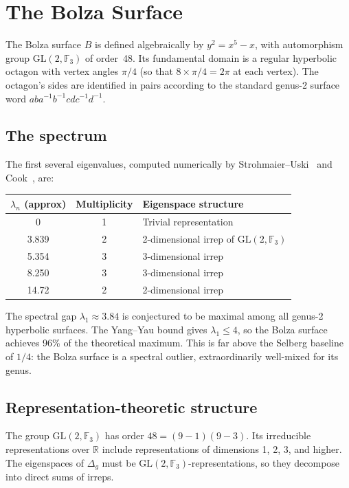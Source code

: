 \documentclass[11pt,a4paper]{article}
\begin{document}
\section{The Bolza Surface}

The Bolza surface $B$ is defined algebraically by $y^2 = x^5 - x$, with
automorphism group $\mathrm{GL}(2, \mathbb{F}_3)$ of order~48. Its fundamental
domain is a regular hyperbolic octagon with vertex angles $\pi/4$ (so that
$8 \times \pi/4 = 2\pi$ at each vertex). The octagon's sides are identified
in pairs according to the standard genus-2 surface word $aba^{-1}b^{-1}cdc^{-1}d^{-1}$.

\subsection{The spectrum}

The first several eigenvalues, computed numerically by
Strohmaier--Uski~\cite{strohmaier2013} and Cook~\cite{cook2018}, are:

\medskip
\begin{center}
\renewcommand{\arraystretch}{1.3}
\begin{tabular}{@{}ccl@{}}
\toprule
$\lambda_n$ (approx) & Multiplicity & Eigenspace structure \\
\midrule
0 & 1 & Trivial representation \\
3.839 & 2 & 2-dimensional irrep of $\mathrm{GL}(2, \mathbb{F}_3)$ \\
5.354 & 3 & 3-dimensional irrep \\
8.250 & 3 & 3-dimensional irrep \\
14.72 & 2 & 2-dimensional irrep \\
\bottomrule
\end{tabular}
\end{center}

\medskip
The spectral gap $\lambda_1 \approx 3.84$ is conjectured to be maximal among
all genus-2 hyperbolic surfaces. The Yang--Yau bound gives $\lambda_1 \leq 4$,
so the Bolza surface achieves 96\% of the theoretical maximum. This is far
above the Selberg baseline of $1/4$: the Bolza surface is a spectral outlier,
extraordinarily well-mixed for its genus.

\subsection{Representation-theoretic structure}

The group $\mathrm{GL}(2, \mathbb{F}_3)$ has order $48 = (9-1)(9-3)$. Its
irreducible representations over $\mathbb{R}$ include representations of
dimensions 1, 2, 3, and higher. The eigenspaces of $\Delta_g$ must be
$\mathrm{GL}(2, \mathbb{F}_3)$-representations, so they decompose into
direct sums of irreps.
\end{document}
